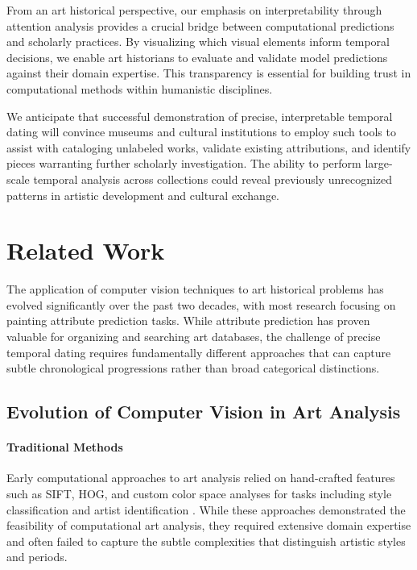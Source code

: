 \documentclass[10pt,twocolumn,letterpaper]{article}
\begin{document}
From an art historical perspective, our emphasis on interpretability through attention analysis provides a crucial bridge between computational predictions and scholarly practices. By visualizing which visual elements inform temporal decisions, we enable art historians to evaluate and validate model predictions against their domain expertise. This transparency is essential for building trust in computational methods within humanistic disciplines.

We anticipate that successful demonstration of precise, interpretable temporal dating will convince museums and cultural institutions to employ such tools to assist with cataloging unlabeled works, validate existing attributions, and identify pieces warranting further scholarly investigation. The ability to perform large-scale temporal analysis across collections could reveal previously unrecognized patterns in artistic development and cultural exchange.

\section{Related Work}

The application of computer vision techniques to art historical problems has evolved significantly over the past two decades, with most research focusing on painting attribute prediction tasks. While attribute prediction has proven valuable for organizing and searching art databases, the challenge of precise temporal dating requires fundamentally different approaches that can capture subtle chronological progressions rather than broad categorical distinctions.

\subsection{Evolution of Computer Vision in Art Analysis}

\paragraph{Traditional Methods} Early computational approaches to art analysis relied on hand-crafted features such as SIFT, HOG, and custom color space analyses for tasks including style classification and artist identification \cite{Karayev14}. While these approaches demonstrated the feasibility of computational art analysis, they required extensive domain expertise and often failed to capture the subtle complexities that distinguish artistic styles and periods.
\end{document}
